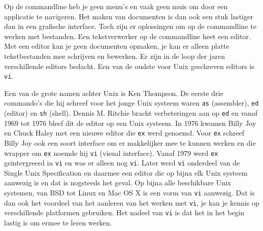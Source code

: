 Op de commandline heb je geen menu's en vaak geen muis om door een applicatie te navigeren. Het maken van documenten is dan ook een stuk lastiger dan in een grafische interface. Toch zijn er oplossingen om op de commandline te werken met bestanden. Een tekstverwerker op de commandline heet een editor. Met een editor kan je geen documenten opmaken, je kan er alleen platte tekstbestanden mee schrijven en bewerken. Er zijn in de loop der jaren verschillende editors bedacht. Een van de oudste voor Unix geschreven editors is \texttt{vi}.

Een van de grote namen achter Unix is Ken Thompson. De eerste drie commando's die hij schreef voor het jonge Unix systeem waren \texttt{as} (assembler), \texttt{ed} (editor) en \texttt{sh} (shell). Dennis M. Ritchie bracht verbeteringen aan op \texttt{ed} en vanaf 1969 tot 1976 bleef dit de editor op een Unix systeem. In 1976 kwamen Billy Joy en Chuck Haley met een nieuwe editor die \texttt{ex} werd genoemd. Voor \texttt{ex} schreef Billy Joy ook een soort interface om er makkelijker mee te kunnen werken en die wrapper om \texttt{ex} noemde hij \texttt{vi} (visual interface). Vanaf 1979 werd \texttt{ex} geintergreerd in \texttt{vi} en was er alleen nog \texttt{vi}. Later werd \texttt{vi} onderdeel van de Single Unix Specification en daarmee een editor die op bijna elk Unix systeem aanwezig is en dat is nogsteeds het geval. Op bijna alle beschikbare Unix systemen, van BSD tot Linux en Mac OS X is een vorm van \texttt{vi} aanwezig. Dat is dan ook het voordeel van het aanleren van het werken met \texttt{vi}, je kan je kennis op verschillende platformen gebruiken. Het nadeel van \texttt{vi} is dat het in het begin lastig is om ermee te leren werken.

